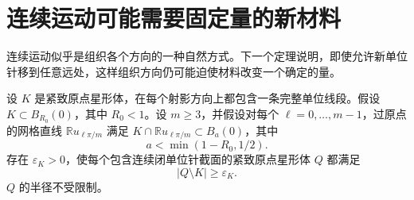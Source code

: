 \section{连续运动可能需要固定量的新材料}\label{sec:density}
连续运动似乎是组织各个方向的一种自然方式。下一个定理说明，即使允许新单位针移到任意远处，这样组织方向仍可能迫使材料改变一个确定的量。

\begin{theorem}[短轴障碍]\label{thm:short-axis}
设 $K$ 是紧致原点星形体，在每个射影方向上都包含一条完整单位线段。假设 $K\subset B_{R_0}(0)$，其中 $R_0<1$。设 $m\ge3$，并假设对每个 $\ell=0,\ldots,m-1$，过原点的网格直线 $\mathbb R u_{\ell\pi/m}$ 满足 $K\cap\mathbb R u_{\ell\pi/m}\subset B_a(0)$，其中
\[
 a<\min(1-R_0,1/2).
\]
存在 $\varepsilon_K>0$，使每个包含连续闭单位针截面的紧致原点星形体 $Q$ 都满足
\[
 |Q\setminus K|\ge\varepsilon_K.
\]
$Q$ 的半径不受限制。
\end{theorem}

